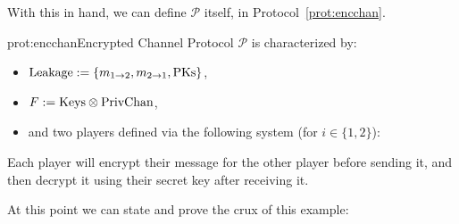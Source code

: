 With this in hand, we can define $\mathcal{P}$ itself, in Protocol~\ref{prot:encchan}.

\begin{protocol}{prot:encchan}{Encrypted Channel Protocol}
    $\mathcal{P}$ is characterized by:
    \begin{itemize}
        \item $\text{Leakage} := \{m_{1\to 2}, m_{2\to1}, \text{PKs}\}$,
        \item $F := \text{Keys} \otimes \text{PrivChan}$,
        \item and two players defined via the following system (for $i \in \{1, 2\}$):
    \end{itemize}

\end{protocol}

Each player will encrypt their message for the other player before sending it,
and then decrypt it using their secret key after receiving it.

At this point we can state and prove the crux of this example:

